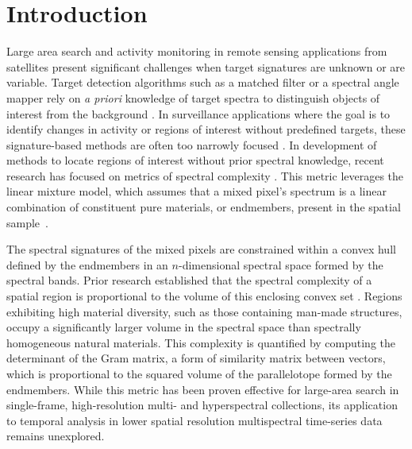 \documentclass[conference,a4paper]{IEEEtran}
\begin{document}
\section{Introduction}

Large area search and activity monitoring in remote sensing applications from satellites present significant challenges when target signatures are unknown or are variable. Target detection algorithms such as a matched filter or a spectral angle mapper rely on \textit{a priori} knowledge of target spectra to distinguish objects of interest from the background \cite{manolakis_hyperspectral_2003, schaum_linear_2003, chen_target_2023}. In surveillance applications where the goal is to identify changes in activity or regions of interest without predefined targets, these signature-based methods are often too narrowly focused \cite{ben_salem_anomaly_2014}. In development of methods to locate regions of interest without prior spectral knowledge, recent research has focused on metrics of spectral complexity \cite{messinger_metrics_2012, ziemann_using_2010}. This metric leverages the linear mixture model, which assumes that a mixed pixel's spectrum is a linear combination of constituent pure materials, or endmembers, present in the spatial sample~\cite{schott_subpixel_2003, lee_subpixel_2003}. 

The spectral signatures of the mixed pixels are constrained within a convex hull defined by the endmembers in an $n$-dimensional spectral space formed by the spectral bands. Prior research established that the spectral complexity of a spatial region is proportional to the volume of this enclosing convex set \cite{messinger_metrics_2012, ziemann_using_2010}.  Regions exhibiting high material diversity, such as those containing man-made structures, occupy a significantly larger volume in the spectral space than spectrally homogeneous natural materials. This complexity is quantified by computing the determinant of the Gram matrix, a form of similarity matrix between vectors, which is proportional to the squared volume of the parallelotope formed by the endmembers. While this metric has been proven effective for large-area search in single-frame, high-resolution multi- and hyperspectral collections, its application to temporal analysis in lower spatial resolution multispectral time-series data remains unexplored. 
\end{document}
